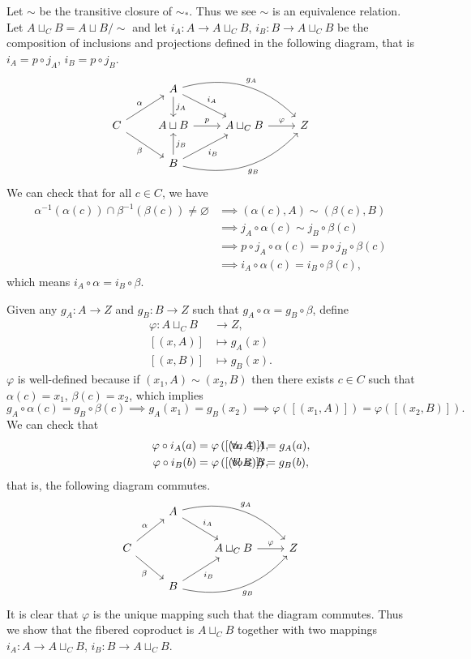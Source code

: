 \begin{solution}
	Let $\sim$ be the transitive closure of $\sim_*$. Thus we see $\sim$ is an equivalence relation. Let $A\sqcup_C B =A\sqcup B/\sim$ and let $i_A:A\to A\sqcup_C B$, $i_B:B\to A\sqcup_C B $ be the composition of inclusions and projections defined in the following diagram, that is $i_A=p\circ j_A$, $i_B=p\circ j_B$. 
	\[\begin{tikzcd}
		& A\arrow[dr,"i_A"]\arrow[d,"j_A"]\arrow[drr,bend left,"g_A"]&&\\
		C\arrow[ur,"\alpha"]\arrow[dr,swap,"\beta"]&A\sqcup B\arrow[r,"p"]&A\sqcup_C B\arrow[r,"\varphi"]&Z \\
		& B\arrow[u,swap,"j_B"]\arrow[ur,swap,"i_B"]\arrow[urr,bend right,swap,"g_B"]&&
	\end{tikzcd}\]
	We can check that for all $c\in C$, we have
	\begin{align*}
	\alpha^{-1}(\alpha(c))\cap \beta^{-1}(\beta(c))\ne\varnothing &\implies (\alpha(c),A)\sim(\beta(c),B)\\
	&\implies j_A\circ\alpha(c)\sim j_B\circ\beta(c)\\
	&\implies p\circ j_A\circ\alpha(c)=p\circ j_B\circ\beta(c)\\
	&\implies i_A\circ\alpha(c)= i_B\circ\beta(c),
	\end{align*}
	which means $i_A\circ\alpha= i_B\circ\beta$.
	
	Given any $g_A:A\to Z$ and $g_B:B\to Z$ such that $ g_A\circ\alpha= g_B\circ\beta$, define
	\begin{align*}
		\varphi:A\sqcup_C B&\longrightarrow Z, \\  
		[(x,A)]&\longmapsto g_A(x)\\
		[(x,B)]&\longmapsto g_B(x).
	\end{align*}
	$\varphi$ is well-defined because if $(x_1,A)\sim (x_2,B)$ then there exists $c\in C$ such that $\alpha(c)=x_1$, $\beta(c)=x_2$, which implies
	\[
	g_A\circ\alpha(c)= g_B\circ\beta(c)\implies g_A(x_1)=g_B(x_2)\implies\varphi\left([(x_1,A)]\right)=\varphi\left([(x_2,B)]\right).
	\]
	We can check that
	\begin{align*}
	\varphi\circ i_A(a)&=\varphi\left([(a,A)]\right)=g_A(a),&\hspace{-8em}\forall a\in A,\\
	\varphi\circ i_B(b)&=\varphi\left([(b,B)]\right)=g_B(b),&\hspace{-8em}\forall b\in B,
	\end{align*}
	that is, the following diagram commutes.
	\[\begin{tikzcd}
	& A\arrow[dr,"i_A"]\arrow[drr,bend left,"g_A"]&&\\
	C\arrow[ur,"\alpha"]\arrow[dr,swap,"\beta"]&&A\sqcup_C B\arrow[r,"\varphi"]&Z \\
	& B\arrow[ur,swap,"i_B"]\arrow[urr,bend right,swap,"g_B"]&&
	\end{tikzcd}\]
	It is clear that $\varphi$ is the unique mapping such that the diagram commutes. Thus we show that the fibered coproduct is $A\sqcup_C B$ together with two mappings $i_A:A\to A\sqcup_C B$, $i_B:B\to A\sqcup_C B$.
	
\end{solution}